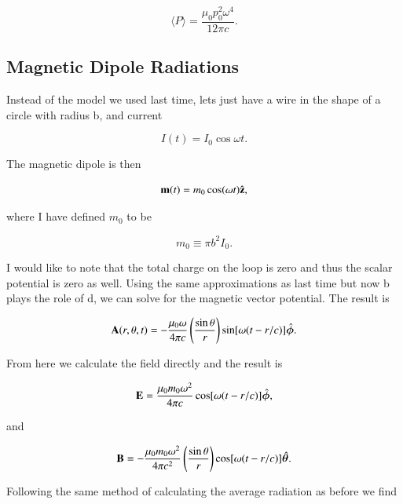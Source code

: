 \documentclass[preprint, review,12pt]{elsarticle}
\def\b{\textbf}
\def\={\equiv}
\def\9{\left(}
\def\0{\right)}
\newcommand{\hb}[1]{\hat{\b #1}}
\newcommand{\hbm}[1]{\hat{\bm #1}}
\newcommand{\brak}[1]{\langle #1 \rangle}
\begin{document}
\begin{equation}
    \brak{P} = \frac{\mu_0 p_0^2 \omega^4}{12 \pi c}.
\end{equation}

\subsection{Magnetic Dipole Radiations}

Instead of the model we used last time, lets just have a wire in the shape of a circle with radius b, and current 

\begin{equation}
    I(t) = I_0 \cos\omega t.
\end{equation}

The magnetic dipole is then 

\begin{equation}
    \b m(t) = m_0 \cos(\omega t) \hb{z},
\end{equation}

where I have defined $m_0$ to be

\begin{equation}
    m_0 \= \pi b^2 I_0.
\end{equation}

I would like to note that the total charge on the loop is zero and thus the scalar potential is zero as well. Using the same approximations as last time but now b plays the role of d, we can solve for the magnetic vector potential. The result is

\begin{equation}
    \b A(r, \theta, t) = - \frac{\mu_0 \omega}{4 \pi c} \9 \frac{\sin\theta}{r} \0 \sin[\omega (t-r/c)] \hbm{\phi}.
\end{equation}

From here we calculate the field directly and the result is

\begin{equation}
    \b E = \frac{\mu_0 m_0 \omega^2}{4 \pi c}\cos[\omega(t-r/c)] \hbm{\phi},
\end{equation}

and

\begin{equation}
    \b B = - \frac{\mu_0 m_0 \omega^2}{4 \pi c^2} \9 \frac{\sin\theta}{r} \0 \cos[\omega(t-r/c)]\hbm{\theta}.
\end{equation}

Following the same method of calculating the average radiation as before we find
\end{document}
